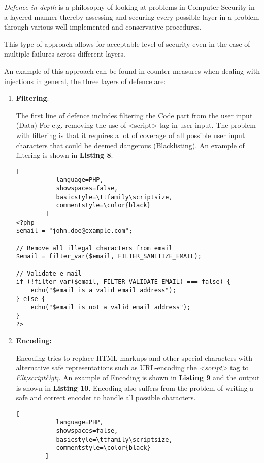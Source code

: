 \documentclass[10pt,a4paper,oneside]{article}
\begin{document}
\textit{Defence-in-depth} is a philosophy of looking at problems in Computer Security in a layered manner thereby assessing and securing every possible layer in a problem through various well-implemented and conservative procedures.
\par
This type of approach allows for acceptable level of security even in the case of multiple failures across different layers.
\par
An example of this approach can be found in counter-measures when dealing with injections in general, the three layers of defence are:
\begin{enumerate}
\item \textbf{Filtering}:

The first line of defence includes filtering the Code part from the user input (Data) For e.g. removing the use of <script> tag in user input. The problem with filtering is that it requires a lot of coverage of all possible user input characters that could be deemed dangerous (Blacklisting). An example of filtering is shown in \textbf{Listing 8}.

\lstset{keywordstyle=\bfseries}
\begin{lstlisting}[
           language=PHP,
           showspaces=false,
           basicstyle=\ttfamily\scriptsize,
           commentstyle=\color{black}
        ]
<?php
$email = "john.doe@example.com";

// Remove all illegal characters from email
$email = filter_var($email, FILTER_SANITIZE_EMAIL);

// Validate e-mail
if (!filter_var($email, FILTER_VALIDATE_EMAIL) === false) {
    echo("$email is a valid email address");
} else {
    echo("$email is not a valid email address");
}
?> 
\end{lstlisting}

\item \textbf{Encoding:}

Encoding tries to replace HTML markups and other special characters with alternative  safe representations such as URL-encoding the \textit{<script>} tag to \textit{\&lt;script\&gt;}. An example of Encoding is shown in \textbf{Listing 9} and the output is shown in \textbf{Listing 10}. Encoding also suffers from the problem of writing a safe and correct encoder to handle all possible characters.

\lstset{keywordstyle=\bfseries}
\begin{lstlisting}[
           language=PHP,
           showspaces=false,
           basicstyle=\ttfamily\scriptsize,
           commentstyle=\color{black}
        ]


\end{lstlisting}
\end{enumerate}
\end{document}
